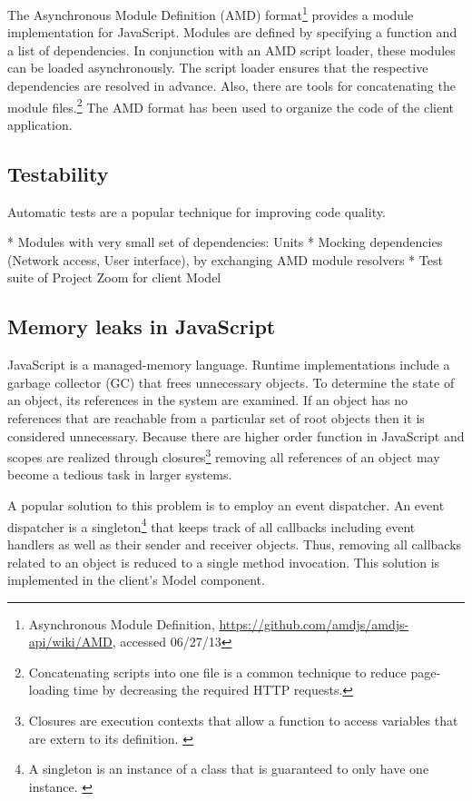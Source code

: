 The Asynchronous Module Definition (AMD) format\footnote{Asynchronous Module Definition, \url{https://github.com/amdjs/amdjs-api/wiki/AMD}, accessed 06/27/13} provides a module implementation for JavaScript. Modules are defined by specifying a function and a list of dependencies. In conjunction with an AMD script loader, these modules can be loaded asynchronously. The script loader ensures that the respective dependencies are resolved in advance. Also, there are tools for concatenating the module files.\footnote{Concatenating scripts into one file is a common technique to reduce page-loading time by decreasing the required HTTP requests.} The AMD format has been used to organize the code of the client application.

\subsection{Testability}
Automatic tests are a popular technique for improving code quality. 

* Modules with very small set of dependencies: Units
* Mocking dependencies (Network access, User interface), by exchanging AMD module resolvers
* Test suite of Project Zoom for client Model

\subsection{Memory leaks in JavaScript}
JavaScript is a managed-memory language. Runtime implementations include a garbage collector (GC) that frees unnecessary objects. To determine the state of an object, its references in the system are examined. If an object has no references that are reachable from a particular set of root objects then it is considered unnecessary. Because there are higher order function in JavaScript and scopes are realized through closures\footnote{Closures are execution contexts that allow a function to access variables that are extern to its definition. \cite{Resig_2013}} removing all references of an object may become a tedious task in larger systems. 

A popular solution to this problem is to employ an event dispatcher. An event dispatcher is a singleton\footnote{A singleton is an instance of a class that is guaranteed to only have one instance. \cite{Gamma_1994}} that keeps track of all callbacks including event handlers as well as their sender and receiver objects. Thus, removing all callbacks related to an object is reduced to a single method invocation. This solution is implemented in the client's Model component.


